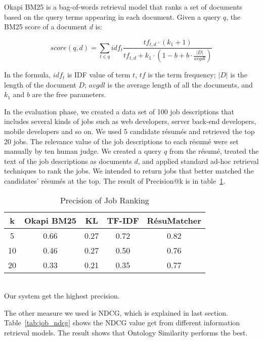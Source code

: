 Okapi BM25 is a bag-of-words retrieval model that ranks a set of documents based on the query terms appearing in each document. Given a query $q$, the BM25 score of a document $d$ is:

$$ score(q,d) = \sum_{ t \in q  }  idf_t \frac {tf_{t,d} \cdot(k_1 +1) }  {tf_{t,d} +k_1 \cdot ( 1-b + b\cdot \frac { \left | D \right |}{avgdl})}  $$

In the formula, $idf_t$ is IDF value of term $t$, $tf$ is the term frequency; $ |D|$ is the length of the document $D$; $avgdl$ is the average length of all the documents, and $k_1$ and $b$ are the free parameters.

In the evaluation phase, we created a data set of 100 job descriptions that includes several kinds of jobs such as web developers, server back-end developers, mobile developers and so on. We used 5 candidate r\'esum\'es and retrieved the top 20 jobs.  The relevance value of the job descriptions to each r\'esum\'e were set manually by ten human judge. We created a query $q$ from the r\'esum\'e, treated the text of the job descriptions as documents $d$, and applied standard ad-hoc retrieval techniques to rank the jobs. We intended to return jobs that better matched the candidates' r\'esum\'es at the top. The result of Precision@k is in table~\ref{tab:job_precision}.


\begin{table}[ht]
\caption{Precision of Job Ranking } %
\centering %
\begin{tabular}{    | c | c | c | c | c |  }
 \hline
       k     & Okapi BM25 & KL    & TF-IDF   & R\'esuMatcher  \\
 \hline
       5     & 0.66       & 0.27  & 0.72     & 0.82   \\
 \hline
       10    & 0.46       & 0.27  & 0.50     & 0.76   \\
 \hline
       20    & 0.33       & 0.21  & 0.35     & 0.77   \\
 \hline

\end{tabular}
\label{tab:job_precision} %
\\Our system get the highest precision.
\end{table}

The other measure we used is NDCG, which is explained in last section. Table~\ref{tab:job_ndcg} shows the NDCG value get from different information retrieval models. The result shows that Ontology Similarity  performs the best.

